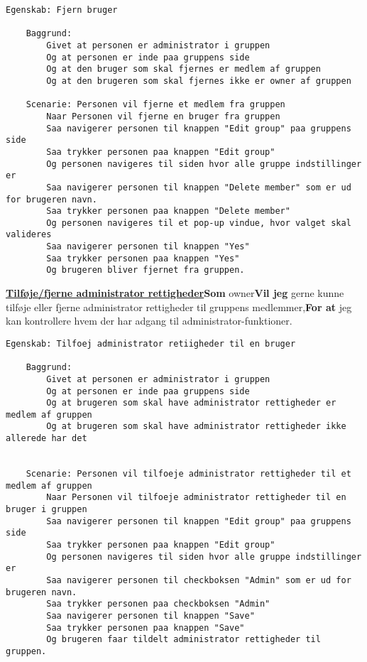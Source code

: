 \begin{lstlisting}[language=Gherkin]
Egenskab: Fjern bruger

    Baggrund:
        Givet at personen er administrator i gruppen
        Og at personen er inde paa gruppens side
        Og at den bruger som skal fjernes er medlem af gruppen
        Og at den brugeren som skal fjernes ikke er owner af gruppen
        
    Scenarie: Personen vil fjerne et medlem fra gruppen
        Naar Personen vil fjerne en bruger fra gruppen
        Saa navigerer personen til knappen "Edit group" paa gruppens side
        Saa trykker personen paa knappen "Edit group"
        Og personen navigeres til siden hvor alle gruppe indstillinger er
        Saa navigerer personen til knappen "Delete member" som er ud for brugeren navn.
        Saa trykker personen paa knappen "Delete member"
        Og personen navigeres til et pop-up vindue, hvor valget skal valideres
        Saa navigerer personen til knappen "Yes"
        Saa trykker personen paa knappen "Yes"
        Og brugeren bliver fjernet fra gruppen.

\end{lstlisting}

\textbf{\underline{Tilføje/fjerne administrator rettigheder}}\newline \textbf{Som} owner\newline \textbf{Vil jeg} gerne kunne tilføje eller fjerne administrator rettigheder til gruppens medlemmer,\newline \textbf{For at} jeg kan kontrollere hvem der har adgang til administrator-funktioner. 

\begin{lstlisting}[language=Gherkin]
Egenskab: Tilfoej administrator retiigheder til en bruger

    Baggrund:
        Givet at personen er administrator i gruppen
        Og at personen er inde paa gruppens side
        Og at brugeren som skal have administrator rettigheder er medlem af gruppen
        Og at brugeren som skal have administrator rettigheder ikke allerede har det
        
        
    Scenarie: Personen vil tilfoeje administrator rettigheder til et medlem af gruppen
        Naar Personen vil tilfoeje administrator rettigheder til en bruger i gruppen
        Saa navigerer personen til knappen "Edit group" paa gruppens side
        Saa trykker personen paa knappen "Edit group"
        Og personen navigeres til siden hvor alle gruppe indstillinger er
        Saa navigerer personen til checkboksen "Admin" som er ud for brugeren navn.
        Saa trykker personen paa checkboksen "Admin"
        Saa navigerer personen til knappen "Save"
        Saa trykker personen paa knappen "Save"
        Og brugeren faar tildelt administrator rettigheder til gruppen.

\end{lstlisting}

